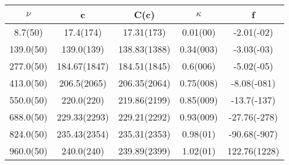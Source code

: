 \begin{table}[H]
	\centering
	\begin{tabular}{ccccc}
		$\nu$ & c & C(c) & $\kappa$ & f\\
		\hline
		8.7(50) & 17.4(174) & 17.31(173) & 0.01(00) & -2.01(-02)	\\
		139.0(50) & 139.0(139) & 138.83(1388) & 0.34(003) & -3.03(-03)	\\
		277.0(50) & 184.67(1847) & 184.51(1845) & 0.6(006) & -5.02(-05)	\\
		413.0(50) & 206.5(2065) & 206.35(2064) & 0.75(008) & -8.08(-081)	\\
		550.0(50) & 220.0(220) & 219.86(2199) & 0.85(009) & -13.7(-137)	\\
		688.0(50) & 229.33(2293) & 229.21(2292) & 0.93(009) & -27.76(-278)	\\
		824.0(50) & 235.43(2354) & 235.31(2353) & 0.98(01) & -90.68(-907)	\\
		960.0(50) & 240.0(240) & 239.89(2399) & 1.02(01) & 122.76(1228)	\\
	\end{tabular}
\end{table}